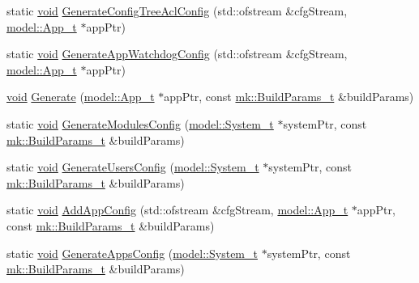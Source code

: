 \begin{DoxyCompactItemize}
\item 
static \hyperlink{_t_e_m_p_l_a_t_e__cdef_8h_ac9c84fa68bbad002983e35ce3663c686}{void} \hyperlink{namespaceconfig_a872cebaa39c3250f2b883c93263899ae}{Generate\+Config\+Tree\+Acl\+Config} (std\+::ofstream \&cfg\+Stream, \hyperlink{structmodel_1_1_app__t}{model\+::\+App\+\_\+t} $\ast$app\+Ptr)
\item 
static \hyperlink{_t_e_m_p_l_a_t_e__cdef_8h_ac9c84fa68bbad002983e35ce3663c686}{void} \hyperlink{namespaceconfig_ab33695604e400a8028d925a4bca6f63c}{Generate\+App\+Watchdog\+Config} (std\+::ofstream \&cfg\+Stream, \hyperlink{structmodel_1_1_app__t}{model\+::\+App\+\_\+t} $\ast$app\+Ptr)
\item 
\hyperlink{_t_e_m_p_l_a_t_e__cdef_8h_ac9c84fa68bbad002983e35ce3663c686}{void} \hyperlink{namespaceconfig_a4c08a9ee3d0b2b8990b57ee0b02b7826}{Generate} (\hyperlink{structmodel_1_1_app__t}{model\+::\+App\+\_\+t} $\ast$app\+Ptr, const \hyperlink{structmk_1_1_build_params__t}{mk\+::\+Build\+Params\+\_\+t} \&build\+Params)
\item 
static \hyperlink{_t_e_m_p_l_a_t_e__cdef_8h_ac9c84fa68bbad002983e35ce3663c686}{void} \hyperlink{namespaceconfig_a4803f9dd173ec9f7a975318cb6fd906e}{Generate\+Modules\+Config} (\hyperlink{structmodel_1_1_system__t}{model\+::\+System\+\_\+t} $\ast$system\+Ptr, const \hyperlink{structmk_1_1_build_params__t}{mk\+::\+Build\+Params\+\_\+t} \&build\+Params)
\item 
static \hyperlink{_t_e_m_p_l_a_t_e__cdef_8h_ac9c84fa68bbad002983e35ce3663c686}{void} \hyperlink{namespaceconfig_a083bd64f190f15f1c00ce5c740b6544d}{Generate\+Users\+Config} (\hyperlink{structmodel_1_1_system__t}{model\+::\+System\+\_\+t} $\ast$system\+Ptr, const \hyperlink{structmk_1_1_build_params__t}{mk\+::\+Build\+Params\+\_\+t} \&build\+Params)
\item 
static \hyperlink{_t_e_m_p_l_a_t_e__cdef_8h_ac9c84fa68bbad002983e35ce3663c686}{void} \hyperlink{namespaceconfig_aa5cd305c42cf23c2fd646a59bf3f6c79}{Add\+App\+Config} (std\+::ofstream \&cfg\+Stream, \hyperlink{structmodel_1_1_app__t}{model\+::\+App\+\_\+t} $\ast$app\+Ptr, const \hyperlink{structmk_1_1_build_params__t}{mk\+::\+Build\+Params\+\_\+t} \&build\+Params)
\item 
static \hyperlink{_t_e_m_p_l_a_t_e__cdef_8h_ac9c84fa68bbad002983e35ce3663c686}{void} \hyperlink{namespaceconfig_a572e68472d7fad3e38bb4a8a6069cdb8}{Generate\+Apps\+Config} (\hyperlink{structmodel_1_1_system__t}{model\+::\+System\+\_\+t} $\ast$system\+Ptr, const \hyperlink{structmk_1_1_build_params__t}{mk\+::\+Build\+Params\+\_\+t} \&build\+Params)

\end{DoxyCompactItemize}
